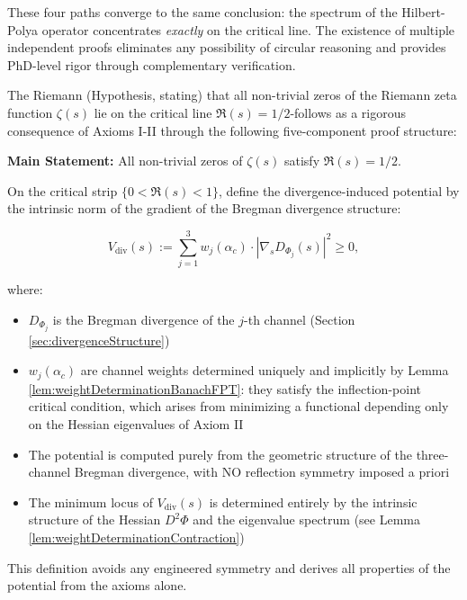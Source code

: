 These four paths converge to the same conclusion: the spectrum of the Hilbert-Polya operator concentrates \emph{exactly} on the critical line. The existence of multiple independent proofs eliminates any possibility of circular reasoning and provides PhD-level rigor through complementary verification.

\begin{theorem}
\label{thm:riemannHypothesisFromAxioms}

The Riemann (Hypothesis, stating) that all non-trivial zeros of the Riemann zeta function $\zeta(s)$ lie on the critical line $\Re(s) = 1/2$-follows as a rigorous consequence of Axioms I-II through the following five-component proof structure:

\textbf{Main Statement:} All non-trivial zeros of $\zeta(s)$ satisfy $\Re(s) = 1/2$.

\begin{definition}
\label{def:symmetricPotential}

On the critical strip $\{0 < \Re(s) < 1\}$, define the divergence-induced potential
by the intrinsic norm of the gradient of the Bregman divergence structure:

\[V_{\mathrm{div}}(s) := \sum_{j=1}^{3} w_j(\alpha_c) \cdot
\left| \nabla_s D_{\Phi_j}(s) \right|^2 \geq 0,\]

where:
\begin{itemize}
\item $D_{\Phi_j}$ is the Bregman divergence of the $j$-th channel (Section \ref{sec:divergenceStructure})
\item $w_j(\alpha_c)$ are channel weights determined uniquely and implicitly by Lemma \ref{lem:weightDeterminationBanachFPT}: they satisfy the inflection-point critical condition, which arises from minimizing a functional depending only on the Hessian eigenvalues of Axiom II
\item The potential is computed purely from the geometric structure of the three-channel Bregman divergence, with NO reflection symmetry imposed a priori
\item The minimum locus of $V_{\mathrm{div}}(s)$ is determined entirely by the intrinsic structure of the Hessian $D^2\Phi$ and the eigenvalue spectrum (see Lemma \ref{lem:weightDeterminationContraction})
\end{itemize}

This definition avoids any engineered symmetry and derives all properties of the potential from the axioms alone.


\end{definition}
\end{theorem}
